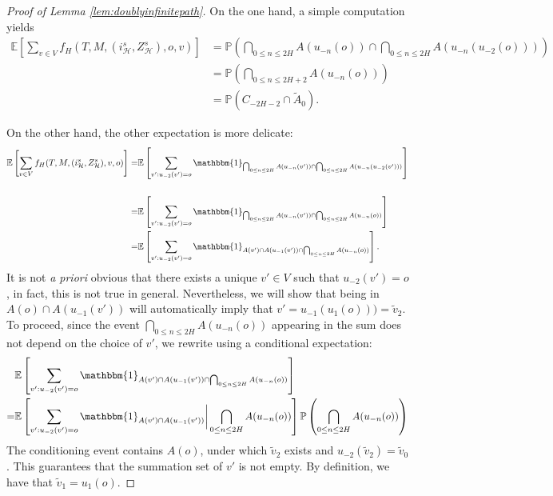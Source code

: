 \documentclass[11pt]{article}
\begin{document}
\begin{proof}[Proof of Lemma \ref{lem:doublyinfinitepath}]
    On the one hand, a simple computation yields
    \begin{align*}
     \mathbb{E}\left[\sum_{v \in V}f_{H}(T,M,(i^s_{\mathcal{H}},Z^s_{\mathcal{H}}),o,v)\right] &=\mathbb{P}\left( \bigcap_{0 \leq n \leq 2H} A(u_{-n}(o)) \cap  \bigcap_{0 \leq n \leq 2H} A(u_{-n}(u_{-2}(o)))  \right) \\ 
     &= \mathbb{P}\left( \bigcap_{0 \leq n \leq 2H+2 }A(u_{-n}(o))  \right)\\
     &= \mathbb{P}\left(C_{-2H-2} \cap \tilde{A}_0\right).
     \end{align*}
     
     On the other hand, the other expectation is more delicate:
    \begin{align*}
     \mathbb{E}\left[\sum_{v \in V}f_{H}(T,M,(i^s_{\mathcal{H}},Z^s_{\mathcal{H}}),v,o)\right] = &\mathbb{E}\left[ \sum_{v': u_{-2}(v')=o} \mathbbm{1}_{ \bigcap_{0 \leq n \leq 2H} A(u_{-n}(v')) \cap \bigcap_{0 \leq n \leq 2H} A(u_{-n}( u_{-2}(v')))} \right] \\
     \\
     =&\mathbb{E}\left[ \sum_{v': u_{-2}(v')=o} \mathbbm{1}_{ \bigcap_{0 \leq n \leq 2H} A(u_{-n}(v')) \cap \bigcap_{0 \leq n \leq 2H} A(u_{-n}( o))} \right] \\
     =&\mathbb{E}\left[ \sum_{v': u_{-2}(v')=o} \mathbbm{1}_{ A(v') \cap A(u_{-1}(v')) \cap \bigcap_{0 \leq n \leq 2H} A(u_{-n}( o))} \right].   
     \end{align*}
     It is not \emph{a priori} obvious that there exists a unique $v'\in V$ such that $u_{-2}(v')=o$, in fact, this is not true in general.
     Nevertheless, we will show that being in $A(o)\cap A(u_{-1}(v'))$ will automatically imply that $v'=u_{-1}(u_{1}(o)))=\tilde{v}_2$.
    To proceed, since the event $\bigcap_{0 \leq n \leq 2H} A(u_{-n}( o))$ appearing in the sum does not depend on the choice of $v'$, we rewrite using a conditional expectation:
    \begin{align*}
        &\mathbb{E}\left[ \sum_{v': u_{-2}(v')=o} \mathbbm{1}_{ A(v') \cap A(u_{-1}(v')) \cap \bigcap_{0 \leq n \leq 2H} A(u_{-n}( o))} \right]\\
        =&\mathbb{E}\left[ \sum_{v': u_{-2}(v')=o} \mathbbm{1}_{ A(v') \cap A(u_{-1}(v')) } \bigg| \bigcap_{0 \leq n \leq 2H} A(u_{-n}( o)) \right] \mathbb{P}\left(\bigcap_{0 \leq n \leq 2H} A(u_{-n}( o))\right)
    \end{align*}
    The conditioning event contains $A(o)$, under which $\tilde{v}_2$ exists and $u_{-2}(\tilde{v}_2)=\tilde{v}_0$. This guarantees that the summation set of $v'$ is not empty. By definition, we have that $\tilde{v}_1=u_1(o)$.

\end{proof}
\end{document}
